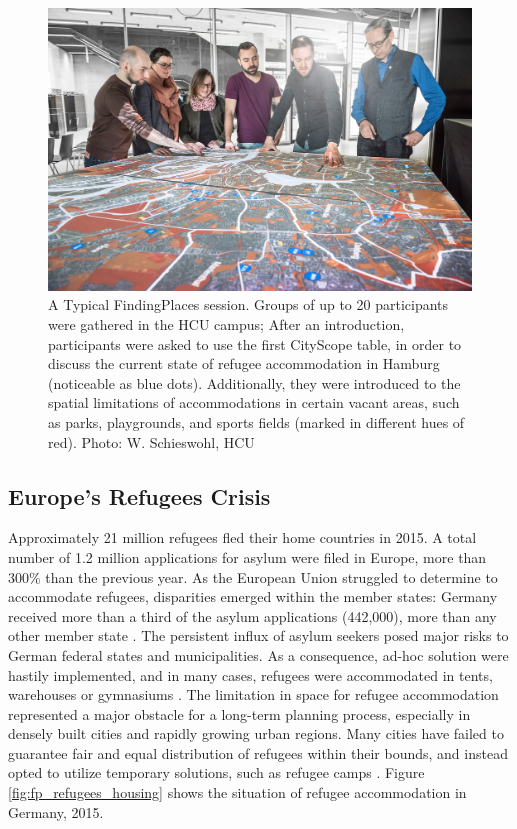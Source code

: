 {    \begin{figure}[!htb]
        \begin{center}
            \includegraphics[width=1\textwidth]{chapters/consensus/findingplaces/figures/fp0.jpg}
        \end{center}
        \caption{A Typical FindingPlaces session. Groups of up to 20 participants were gathered in the HCU campus; After an introduction, participants were asked to use the first CityScope table, in order to discuss the current state of refugee accommodation in Hamburg (noticeable as blue dots). Additionally, they were introduced to the spatial limitations of accommodations in certain vacant areas, such as parks, playgrounds, and sports fields (marked in different hues of red). Photo: W. Schieswohl, HCU}
        \label{fig:fp_session}
    \end{figure}

    \subsection{Europe's Refugees Crisis}

    {
        Approximately 21 million refugees fled their home countries in 2015. A total number of 1.2 million applications for asylum were filed in Europe, more than 300\% than the previous year. As the European Union struggled to determine to accommodate refugees, disparities emerged within the member states: Germany received more than a third of the asylum applications (442,000), more than any other member state \cite{fur2015fluchtlinge}. The persistent influx of asylum seekers posed major risks to German federal states and municipalities. As a consequence, ad-hoc solution were hastily implemented, and in many cases, refugees were accommodated in tents, warehouses or gymnasiums \cite{katz2016cities}. The limitation in space for refugee accommodation represented a major obstacle for a long-term planning process, especially in densely built cities and rapidly growing urban regions. Many cities have failed to guarantee fair and equal distribution of refugees within their bounds, and instead opted to utilize temporary solutions, such as refugee camps \cite{MISSINGM99:online}. Figure \ref{fig:fp_refugees_housing} shows the situation of refugee accommodation in Germany, 2015.

}}
